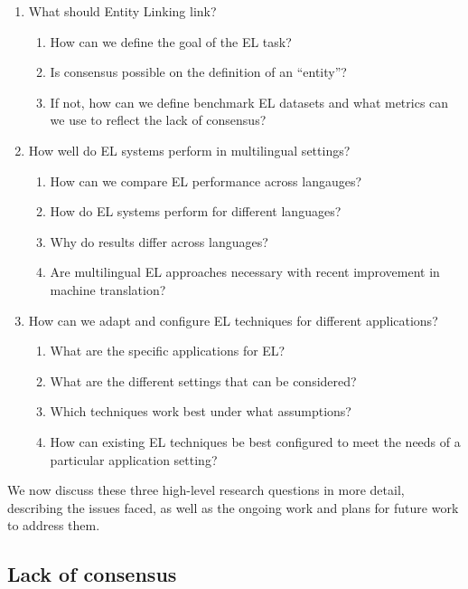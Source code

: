 \documentclass[sigconf]{acmart}
\begin{document}
\begin{enumerate}
    \item What should Entity Linking link?
    \begin{enumerate}
        \item How can we define the goal of the EL task?
        \item Is consensus possible on the definition of an ``entity''?
        \item If not, how can we define benchmark EL datasets and what metrics can we use to reflect the lack of consensus?
    \end{enumerate}
    
    \item How well do EL systems perform in multilingual settings?
    \begin{enumerate}
    	\item How can we compare EL performance across langauges?
        \item How do EL systems perform for different languages?
        \item Why do results differ across languages?
        \item Are multilingual EL approaches necessary with recent improvement in machine translation? 
    \end{enumerate}
    
    \item How can we adapt and configure EL techniques for different applications?
    \begin{enumerate}
    	\item What are the specific applications for EL?
    	\item What are the different settings that can be considered?
    	\item Which techniques work best under what assumptions?
    	\item How can existing EL techniques be best configured to meet the needs of a particular application setting?
    \end{enumerate}
\end{enumerate}

We now discuss these three high-level research questions in more detail, describing the issues faced, as well as the ongoing work and plans for future work to address them.

\subsection{Lack of consensus}
\end{document}
